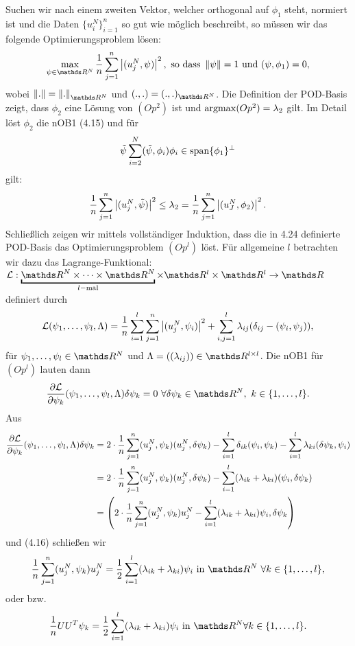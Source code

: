 Suchen wir nach einem zweiten Vektor, welcher orthogonal auf $\phi_1$ steht, normiert ist und die Daten $\{u_i^N\}_{i=1}^n$ so gut wie möglich beschreibt, so müssen wir das folgende Optimierungsproblem lösen:
\[
\max\limits_{\psi\in\R^N} \frac{1}{n} \sum_{j=1}^n \abs{(u_j^N,\psi)}^2, \text{ so dass } \norm{\psi}=1 \text{ und } (\psi,\phi_1)= 0,
\]
wobei $\norm{.} = \norm{.}_{\R^N}$ und $(.,.)=(.,.)_{\R^N}$.
Die Definition der POD-Basis zeigt, dass $\phi_2$ eine Lösung von $(Op^2)$ ist und $\operatorname{argmax} (Op^2)=\lambda_2$ gilt.
Im Detail löst $\phi_2$ die nOB1 (4.15) und für 
\[
\tilde{\psi}\sum_{i=2}^N (\tilde{\psi},\phi_i)\phi_i \in \operatorname{span}\{\phi_1\}^\perp
\]
gilt:
\[
\frac{1}{n} \sum_{j=1}^n \left\vert(u_j^N,\tilde{\psi})\right\vert^2 \le \lambda_2 = \frac{1}{n} \sum_{j=1}^n \left\vert(u_J^N,\phi_2)\right\vert^2.
\]
Schließlich zeigen wir mittels vollständiger Induktion, dass die in 4.24 definierte POD-Basis das Optimierungsproblem $(Op^l)$ löst.
Für allgemeine $l$ betrachten wir dazu das Lagrange-Funktional: $\mathcal{L}:\underbracket{\R^N\dt{\times}\R^N}_{l-\text{mal}}\times \R^l\times \R^l \to \R$ definiert durch
\[
\mathcal{L}(\psi_1, \dots ,\psi_l,\Lambda) = \frac{1}{n} \sum_{i=1}^l\sum_{j=1}^n \left\vert(u_j^N,\psi_i)\right\vert^2 + \sum_{i,j=1}^{l} \lambda_{ij}(\delta_{ij} -  (\psi_i,\psi_j)),
\]
für $\psi_1\dt{,}\psi_l\in \R^N$ und $\Lambda=((\lambda_{ij}))\in \R^{l\times l}$.
Die nOB1 für $(Op^l)$ lauten dann
\begin{align}
\diff{\mathcal{L}}{\psi_k}(\psi_1\dt{,}\psi_l,\Lambda)\delta\psi_k = 0 ~\forall \delta\psi_k\in\R^N,~k\in \{1\dt{,}l\}.
\end{align}
Aus 
\begin{align*}
\frac{\partial \mathcal{L}}{\partial \psi_k} (\psi_1, \dots ,\psi_l,\Lambda)\delta\psi_k &= 2\cdot\frac{1}{n} \sum_{j=1}^n (u_j^N,\psi_k)(u_j^N,\delta\psi_k) - \sum_{i=1}^l \delta_{ik}(\psi_i,\psi_k) - \sum_{i=1}^l \lambda_{ki} (\delta\psi_k,\psi_i)\\
&= 2\cdot\frac{1}{n} \sum_{j=1}^n (u_j^N,\psi_k)(u_j^N,\delta\psi_k) - \sum_{i=1}^l (\lambda_{ik}+\lambda_{ki})(\psi_i,\delta\psi_k)\\
&= \left( 2\cdot\frac{1}{n} \sum_{j=1}^n (u_j^N,\psi_k)u_j^N - \sum_{i=1}^l (\lambda_{ik}+\lambda_{ki})\psi_i,\delta\psi_k\right)
\end{align*}
und (4.16) schließen wir
\begin{align}
\frac{1}{n} \sum_{j=1}^n (u_j^N,\psi_k)u_j^N = \frac{1}{2} \sum_{i=1}^l (\lambda_{ik}+\lambda_{ki})\psi_i \text{ in } \R^N ~\forall k\in\{1\dt{,}l\},
\end{align}
oder bzw.
\begin{align}
\frac{1}{n} UU^T \psi_k = \frac{1}{2} \sum_{i=1}^l (\lambda_{ik}+\lambda_{ki})\psi_i \text{ in } \R^N \forall k\in\{1\dt{,}l\}.
\end{align}
